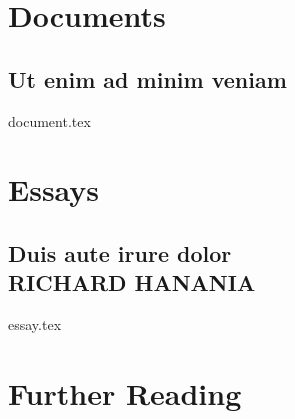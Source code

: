 \documentclass{majorproblem}
\begin{document}
\setcounter{page}{576}
\setcounter{chapter}{14}
\begin{itsec}
    \noindent \blindtext\par
    \blindtext
\end{itsec}
\section*{Documents}
\blindtext \par
\blindtext \par
\blindtext
\subsection{Ut enim ad minim veniam}
\blindtext \par
\blindtext
\blindtext
{document.tex}


\section*{Essays}
\blindtext\par
\subsection*{Duis aute irure dolor\\\textnormal{\MakeUppercase{Richard Hanania}}}
\blindtext \par
\blindtext \par
\blindtext \par
\blindtext \par
\blindtext \par
\blindtext \par
\blindtext \par
\blindtext \par
\blindtext \par
\blindtext \par
{essay.tex}
\section*{Further Reading}
\printfurtherreadingbib
\end{document}
